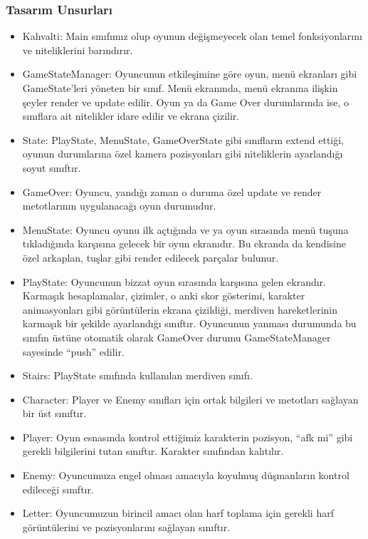 \documentclass[12pt,a4paper]{article}
\begin{document}
   \subsubsection{Tasarım Unsurları}
   \begin{itemize}
      \item Kahvalti: Main sınıfımız olup oyunun değişmeyecek olan temel fonksiyonlarını ve niteliklerini barındırır.
      \item GameStateManager: Oyuncunun etkileşimine göre oyun, menü ekranları gibi GameState’leri yöneten bir sınıf. Menü ekranında, menü ekranına ilişkin şeyler render ve update edilir. Oyun ya da Game Over durumlarında ise, o sınıflara ait nitelikler idare edilir ve ekrana çizilir.
      \item State: PlayState, MenuState, GameOverState gibi sınıfların extend ettiği, oyunun durumlarına özel kamera pozisyonları gibi niteliklerin ayarlandığı soyut sınıftır.
      \item GameOver: Oyuncu, yandığı zaman o duruma özel update ve render metotlarının uygulanacağı oyun durumudur.
      \item MenuState: Oyuncu oyunu ilk açtığında ve ya oyun sırasında menü tuşuna tıkladığında karşısına gelecek bir oyun ekranıdır. Bu ekranda da kendisine özel arkaplan, tuşlar gibi render edilecek parçalar bulunur.
      \item PlayState: Oyuncunun bizzat oyun sırasında karşısına gelen ekrandır. Karmaşık hesaplamalar, çizimler, o anki skor gösterimi, karakter animasyonları gibi görüntülerin ekrana çizildiği, merdiven hareketlerinin karmaşık bir şekilde ayarlandığı sınıftır. Oyuncunun yanması durumunda bu sınıfın üstüne otomatik olarak GameOver durumu GameStateManager sayesinde “push” edilir.
      \item Stairs: PlayState sınıfında kullanılan merdiven sınıfı.
      \item Character: Player ve Enemy sınıfları için ortak bilgileri ve metotları sağlayan bir üst sınıftır.
      \item Player: Oyun esnasında kontrol ettiğimiz karakterin pozisyon, “afk mi” gibi gerekli bilgilerini tutan sınıftır. Karakter sınıfından kalıtılır.
      \item Enemy: Oyuncumuza engel olması amacıyla koyulmuş düşmanların kontrol edileceği sınıftır.
      \item Letter: Oyuncumuzun birincil amacı olan harf toplama için gerekli harf görüntülerini ve pozisyonlarını sağlayan sınıftır.
   \end{itemize}
\end{document}
